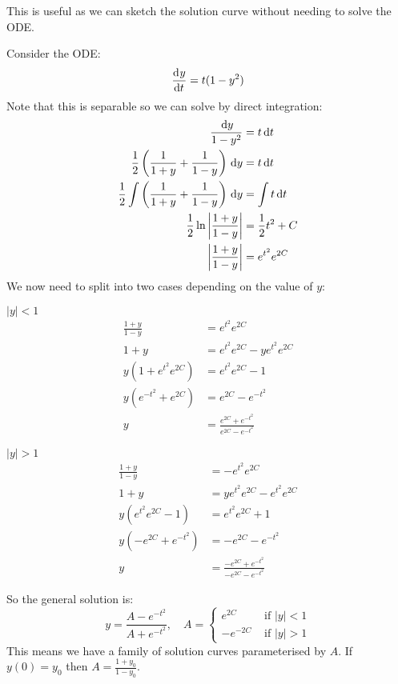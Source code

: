 \documentclass[../main.tex]{subfiles}
\begin{document}
This is useful as we can sketch the solution curve without needing to solve the ODE.
\begin{example}
  Consider the ODE:
  \[
    \deriv{y}{t} = t(1 - y^2)
  \]
  Note that this is separable so we can solve by direct integration:
  \begin{align*}
    \frac{\,\mathrm{d} y}{1 - y^2} &= t \,\mathrm{d} t \\
    \frac{1}{2}\left(\frac{1}{1+y} + \frac{1}{1-y}\right)\,\mathrm{d} y &= t\,\mathrm{d} t \\
    \frac{1}{2} \int \left(\frac{1}{1+y} + \frac{1}{1-y}\right) \,\mathrm{d} y &= \int t \,\mathrm{d} t \\
    \frac{1}{2}\ln \left\lvert \frac{1 + y}{1-y} \right\rvert &= \frac{1}{2}t^2 + C \\
    \left\lvert \frac{1 + y}{1 - y} \right\rvert &= e^{t^2} e^{2C}
  \end{align*}
  We now need to split into two cases depending on the value of $y$:
  \begin{proofcases}
    \begin{case}{$|y| < 1$}
      \vspace{-2em}
      \begin{align*}
        \frac{1 + y}{1 - y} &= e^{t^2} e^{2C} \\
        1 + y &= e^{t^2} e^{2C} - ye^{t^2} e^{2C} \\
        y(1 + e^{t^2}e^{2C}) &= e^{t^2} e^{2C} - 1 \\
        y(e^{-t^2} + e^{2C}) &= e^{2C} - e^{-t^2} \\
        y &= \frac{e^{2C} + e^{-t^2}}{e^{2C} - e^{-t^2}}
      \end{align*}
    \end{case}
    \begin{case}{$|y| > 1$}
      \vspace{-2em}
      \begin{align*}
        \frac{1 + y}{1 - y} &= - e^{t^2} e^{2C} \\
        1 + y &= ye^{t^2} e^{2C} - e^{t^2}e^{2C} \\
        y(e^{t^2}e^{2C} - 1) &= e^{t^2} e^{2C} + 1 \\
        y(-e^{2C} + e^{-t^2}) &= -e^{2C} - e^{-t^2} \\
        y &= \frac{-e^{2C} + e^{-t^2}}{-e^{2C} - e^{-t^2}}
      \end{align*}
    \end{case}
  \end{proofcases}
  So the general solution is:
  \[
    y = \frac{A - e^{-t^2}}{A + e^{-t^2}},\quad A = \begin{cases}
    e^{2C} & \text{ if } |y| < 1 \\
    -e^{-2C} & \text{ if } |y| > 1
    \end{cases}
  \]
  This means we have a family of solution curves parameterised by $A$.
  If $y(0) = y_0$ then $A = \frac{1 + y_0}{1 - y_0}$.
  \begin{center}
\end{center}
\end{example}
\end{document}

